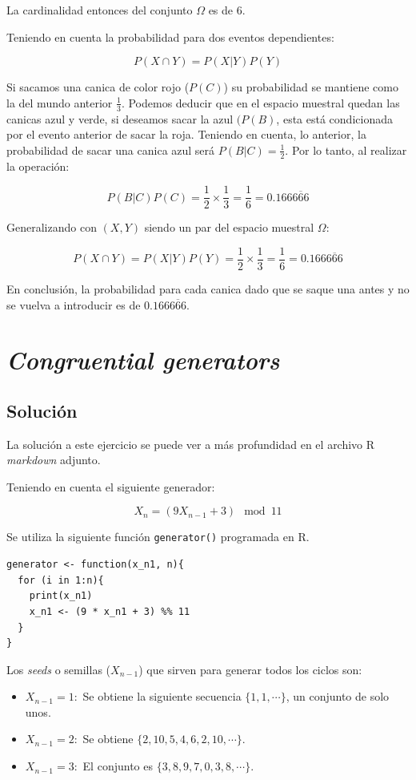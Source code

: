 \documentclass[12pt]{article}
\begin{document}
La cardinalidad entonces del conjunto \(\Omega\) es de 6.

Teniendo en cuenta la probabilidad para dos eventos dependientes:

\[
  P(X \cap Y) = P(X|Y) P(Y)
\]

Si sacamos una canica de color rojo (\(P(C)\)) su probabilidad se mantiene como la del mundo anterior \(\frac{1}{3}\). Podemos deducir que en el espacio muestral quedan las canicas azul y verde, si deseamos sacar la azul \((P(B)\), esta está condicionada por el evento anterior de sacar la roja. Teniendo en cuenta, lo anterior, la probabilidad de sacar una canica azul será \(P(B|C) = \frac{1}{2}\). Por lo tanto, al realizar la operación:

\[
  P(B|C)P(C) = \frac{1}{2} \times \frac{1}{3} = \frac{1}{6} = 0.166\overline{666}
\]

Generalizando con \((X, Y)\) siendo un par del espacio muestral \(\Omega\):

\[
  P(X \cap Y) = P(X|Y)P(Y) = \frac{1}{2} \times \frac{1}{3} = \frac{1}{6} =  0.166\overline{666}
\]

En conclusión, la probabilidad para cada canica dado que se saque una antes y no se vuelva a introducir es de \(0.166\overline{666}\). 

\section{\textit{Congruential generators}}
\subsection{Solución}

La solución a este ejercicio se puede ver a más profundidad en el archivo \textsf{R} \textit{markdown} adjunto.  

Teniendo en cuenta el siguiente generador:

\[
  X_{n} = (9X_{n-1} + 3) \mod 11
\]

Se utiliza la siguiente función \lstinline|generator()| programada en \textsf{R}.

\begin{lstlisting}
generator <- function(x_n1, n){
  for (i in 1:n){
    print(x_n1)
    x_n1 <- (9 * x_n1 + 3) %% 11
  }
}
\end{lstlisting}

Los \textit{seeds} o semillas ($X_{n-1}$) que sirven para generar todos los ciclos son:

\begin{itemize}
  \item $X_{n-1} = 1:$ Se obtiene la siguiente secuencia $\{1, 1, \cdots \}$, un conjunto de solo unos.
  \item $X_{n-1} = 2:$ Se obtiene $\{2, 10, 5, 4, 6, 2, 10, \cdots \}$.
  \item $X_{n-1} = 3:$ El conjunto es $\{3, 8, 9, 7, 0, 3, 8, \cdots \} $.
\end{itemize}
\end{document}
